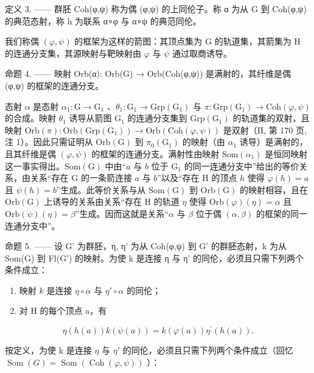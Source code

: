 定义 3. —— 群胚 Coh(φ,ψ) 称为偶 (φ,ψ) 的上同伦子。称 α 为从 G 到 Coh(φ,ψ) 的典范态射，称 h 为联系 α∘φ 与 α∘ψ 的典范同伦。

我们称偶 \((\varphi,\psi)\) 的框架为这样的箭图：其顶点集为 G 的轨道集，其箭集为 H 的连通分支集，其源映射与靶映射由 \(\varphi\) 与 \(\psi\) 通过取商诱导。

命题 4. —— 映射 Orb(α): Orb(G) → Orb(Coh(φ,ψ)) 是满射的，其纤维是偶 (φ,ψ) 的框架的连通分支。

态射 \(\alpha\) 是态射 \(\alpha_{1}\colon\mathrm{G}\to\mathrm{G}_{1}\) 、\(\theta_{1}\colon\mathrm{G}_{1}\to\mathrm{Grp}(\mathrm{G}_{1})\) 与 \(\pi\colon\mathrm{Grp}(\mathrm{G}_{1})\to\mathrm{Coh}(\varphi,\psi)\) 的合成。映射 \(\theta_{1}\) 诱导从箭图 \(\mathrm{G}_{1}\) 的连通分支集到 \(\mathrm{Grp}(\mathrm{G}_{1})\) 的轨道集的双射，且映射 \(\mathrm{Orb}(\pi)\colon\mathrm{Orb}(\mathrm{Grp}(\mathrm{G}_{1}))\to\mathrm{Orb}(\mathrm{Coh}(\varphi,\psi))\) 是双射（II, 第 170 页, 注 1）。因此只需证明从 \(\mathrm{Orb}(\mathrm{G})\) 到 \(\pi_{0}(\mathrm{G}_{1})\) 的映射（由 \(\alpha_{1}\) 诱导）是满射的，且其纤维是偶 \((\varphi,\psi)\) 的框架的连通分支。满射性由映射 \(\mathrm{Som}(\alpha_{1})\) 是恒同映射这一事实得出。\(\mathrm{Som}(\mathrm{G})\) 中由“\(a\) 与 \(b\) 位于 \(\mathrm{G}_{1}\) 的同一连通分支中”给出的等价关系，由关系“存在 G 的一条箭连接 \(a\) 与 \(b\)”以及“存在 H 的顶点 \(h\) 使得 \(\varphi(h)=a\) 且 \(\psi(h)=b\)”生成。此等价关系与从 \(\mathrm{Som}(\mathrm{G})\) 到 \(\mathrm{Orb}(\mathrm{G})\) 的映射相容，且在 \(\mathrm{Orb}(\mathrm{G})\) 上诱导的关系由关系“存在 H 的轨道 \(\eta\) 使得 \(\mathrm{Orb}(\varphi)(\eta)=\alpha\) 且 \(\mathrm{Orb}(\psi)(\eta)=\beta\)”生成。因而这就是关系“\(\alpha\) 与 \(\beta\) 位于偶 \((\alpha,\beta)\) 的框架的同一连通分支中”。

命题 5. —— 设 G' 为群胚，η, η' 为从 Coh(φ,ψ) 到 G' 的群胚态射，k 为从 Som(G) 到 Fl(G') 的映射。为使 k 是连接 η 与 η' 的同伦，必须且只需下列两个条件成立：

\begin{enumerate}
\def\labelenumi{(\roman{enumi})}
\item
  映射 \(k\) 是连接 \(\eta \circ \alpha\) 与 \(\eta' \circ \alpha\) 的同伦；
\item
  对 H 的每个顶点 a，有
\end{enumerate}

\[
\eta (h (a)) k (\psi (a)) = k (\varphi (a)) \eta^ {\prime} (h (a)).
\]

按定义，为使 k 是连接 \(\eta\) 与 \(\eta'\) 的同伦，必须且只需下列两个条件成立（回忆 \(\operatorname{Som}(G) = \operatorname{Som}(\operatorname{Coh}(\varphi, \psi))\) ）：

